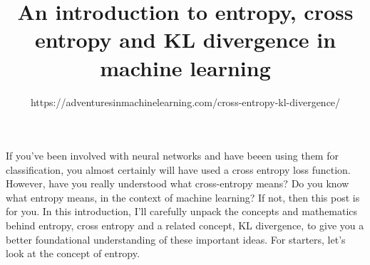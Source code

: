 \documentclass{article}
\title{An introduction to entropy, cross entropy and KL divergence in machine learning}
\author{https://adventuresinmachinelearning.com/cross-entropy-kl-divergence/}
\begin{document}
\maketitle   %
If you’ve been involved with neural networks and have beeen using them for classification, you almost certainly will have used a cross entropy loss function. However, have you really understood what cross-entropy means? Do you know what entropy means, in the context of machine learning? If not, then this post is for you. In this introduction, I’ll carefully unpack the concepts and mathematics behind entropy, cross entropy and a related concept, KL divergence, to give you a better foundational understanding of these important ideas. For starters, let’s look at the concept of entropy.
\end{document}

